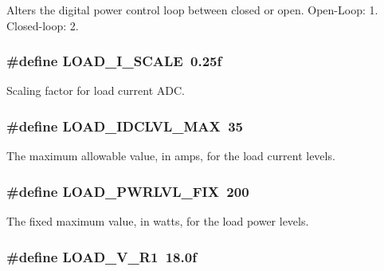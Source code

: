 Alters the digital power control loop between closed or open. Open-\/\-Loop\-: 1. Closed-\/loop\-: 2. \hypertarget{a00043_a0055f791c5646ebc3cacb7a9cf759792}{
\subsubsection[{L\-O\-A\-D\-\_\-\-I\-\_\-\-S\-C\-A\-L\-E}]{\setlength{\rightskip}{0pt plus 5cm}\#define L\-O\-A\-D\-\_\-\-I\-\_\-\-S\-C\-A\-L\-E~0.\-25f}}\label{a00043_a0055f791c5646ebc3cacb7a9cf759792}
Scaling factor for load current A\-D\-C. \hypertarget{a00043_a1dd2b3b31e620e021371603376c6980f}{
\subsubsection[{L\-O\-A\-D\-\_\-\-I\-D\-C\-L\-V\-L\-\_\-\-M\-A\-X}]{\setlength{\rightskip}{0pt plus 5cm}\#define L\-O\-A\-D\-\_\-\-I\-D\-C\-L\-V\-L\-\_\-\-M\-A\-X~35}}\label{a00043_a1dd2b3b31e620e021371603376c6980f}
The maximum allowable value, in amps, for the load current levels. \hypertarget{a00043_aea1e2f7c212899b68d0cb6f4fcd1683d}{
\subsubsection[{L\-O\-A\-D\-\_\-\-P\-W\-R\-L\-V\-L\-\_\-\-F\-I\-X}]{\setlength{\rightskip}{0pt plus 5cm}\#define L\-O\-A\-D\-\_\-\-P\-W\-R\-L\-V\-L\-\_\-\-F\-I\-X~200}}\label{a00043_aea1e2f7c212899b68d0cb6f4fcd1683d}
The fixed maximum value, in watts, for the load power levels. \hypertarget{a00043_a6e7bff785f71de22636e4e4fdc5c39d7}{
\subsubsection[{L\-O\-A\-D\-\_\-\-V\-\_\-\-R1}]{\setlength{\rightskip}{0pt plus 5cm}\#define L\-O\-A\-D\-\_\-\-V\-\_\-\-R1~18.\-0f}}\label{a00043_a6e7bff785f71de22636e4e4fdc5c39d7}
